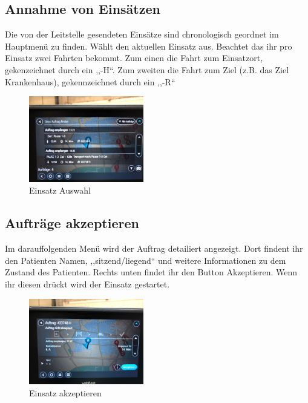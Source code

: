 \documentclass[a4paper,12pt]{scrartcl}
\begin{document}
    \subsection{Annahme von Einsätzen}
    Die von der Leitstelle gesendeten Einsätze sind chronologisch geordnet im Hauptmenü zu finden.
    Wählt den aktuellen Einsatz aus. Beachtet das ihr pro Einsatz zwei Fahrten bekommt. Zum einen die Fahrt zum Einsatzort, gekenzeichnet durch ein
    ,,-H``. Zum zweiten die Fahrt zum Ziel (z.B. das Ziel Krankenhaus), gekennzeichnet durch ein ,,-R``
    \begin{figure}[h]
        \begin{center}
            \includegraphics[width=5cm]{bilder/annahme.jpg}
            \caption{Einsatz Auswahl}
            \label{Auswahl}
        \end{center}
    \end{figure}
    
    \newpage
    \subsection{Aufträge akzeptieren}
    Im darauffolgenden Menü wird der Auftrag detailiert angezeigt. Dort findent ihr den Patienten Namen, ,,sitzend/liegend`` und
    weitere Informationen zu dem Zustand des Patienten. Rechts unten findet ihr den Button Akzeptieren. Wenn ihr diesen drückt wird der Einsatz gestartet.
    \begin{figure}[h]
        \begin{center}
            \includegraphics[width=5cm]{bilder/akzeptieren.jpg}
            \caption{Einsatz akzeptieren}
            \label{akzeptieren}
        \end{center}     
    \end{figure}
\end{document}
